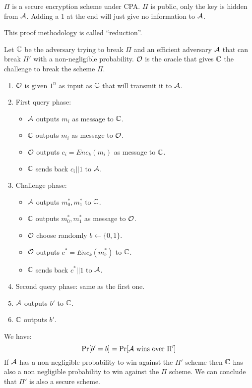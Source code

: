 \begin{solution}
  $\Pi$ is a secure encryption scheme under CPA. $\Pi$ is public, only the key is hidden from $\mathcal{A}$. Adding a 1 at the end will just give no information to $\mathcal{A}$.

  This proof methodology is called ``reduction''.

  Let $\mathbb{C}$ be the adversary trying to break $\Pi$ and an efficient adversary $\mathcal{A}$ that can break $\Pi'$ with a non-negligible probability. $\mathcal{O}$ is the oracle that gives $\mathbb{C}$ the challenge to break the scheme $\Pi$.
  \begin{enumerate}
    \item $\mathcal{O}$ is given $1^n$ as input as $\mathbb{C}$ that will transmit it to $\mathcal{A}$.
    \item First query phase:
      \begin{itemize}
        \item $\mathcal{A}$ outputs $m_i$ as message to $\mathbb{C}$.
        \item $\mathbb{C}$ outputs $m_i$ as message to $\mathcal{O}$.
        \item $\mathcal{O}$ outputs $c_i = Enc_k(m_i)$ as message to $\mathbb{C}$.
        \item $\mathbb{C}$ sends back $c_i||1$ to $\mathcal{A}$.
      \end{itemize}
    \item Challenge phase:
      \begin{itemize}
        \item $\mathcal{A}$ outputs $m_0^\ast, m_1^\ast$ to $\mathbb{C}$.
        \item $\mathbb{C}$ outputs $m_0^\ast, m_1^\ast$ as message to $\mathcal{O}$.
        \item $\mathcal{O}$ choose randomly $b \leftarrow \{0,1\}$.
        \item $\mathcal{O}$ outputs $c^\ast = Enc_k(m_b^\ast)$ to $\mathbb{C}$.
        \item $\mathbb{C}$ sends back $c^\ast||1$ to $\mathcal{A}$.
      \end{itemize}
    \item Second query phase: same as the first one.
    \item $\mathcal{A}$ outputs $b'$ to $\mathbb{C}$.
    \item $\mathbb{C}$ outputs $b'$.
  \end{enumerate}
  We have:
  \[\Pr[b'=b] = \Pr[\mathcal{A} \text{ wins over } \Pi']\]
  If $\mathcal{A}$ has a non-negligible probability to win against the $\Pi'$ scheme then $\mathbb{C}$ has also a non negligible probability to win against the $\Pi$ scheme. We can conclude that $\Pi'$ is also a secure scheme.
\end{solution}



